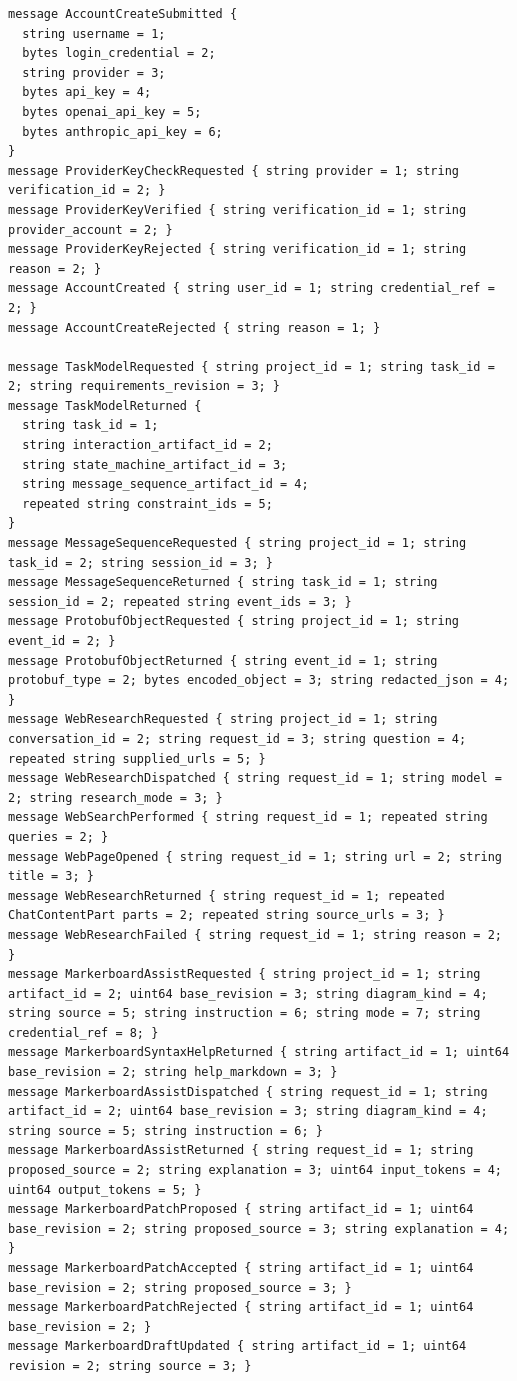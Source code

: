 \begin{lstlisting}[language={},basicstyle=\ttfamily\tiny,breaklines=true]
message AccountCreateSubmitted {
  string username = 1;
  bytes login_credential = 2;
  string provider = 3;
  bytes api_key = 4;
  bytes openai_api_key = 5;
  bytes anthropic_api_key = 6;
}
message ProviderKeyCheckRequested { string provider = 1; string verification_id = 2; }
message ProviderKeyVerified { string verification_id = 1; string provider_account = 2; }
message ProviderKeyRejected { string verification_id = 1; string reason = 2; }
message AccountCreated { string user_id = 1; string credential_ref = 2; }
message AccountCreateRejected { string reason = 1; }

message TaskModelRequested { string project_id = 1; string task_id = 2; string requirements_revision = 3; }
message TaskModelReturned {
  string task_id = 1;
  string interaction_artifact_id = 2;
  string state_machine_artifact_id = 3;
  string message_sequence_artifact_id = 4;
  repeated string constraint_ids = 5;
}
message MessageSequenceRequested { string project_id = 1; string task_id = 2; string session_id = 3; }
message MessageSequenceReturned { string task_id = 1; string session_id = 2; repeated string event_ids = 3; }
message ProtobufObjectRequested { string project_id = 1; string event_id = 2; }
message ProtobufObjectReturned { string event_id = 1; string protobuf_type = 2; bytes encoded_object = 3; string redacted_json = 4; }
message WebResearchRequested { string project_id = 1; string conversation_id = 2; string request_id = 3; string question = 4; repeated string supplied_urls = 5; }
message WebResearchDispatched { string request_id = 1; string model = 2; string research_mode = 3; }
message WebSearchPerformed { string request_id = 1; repeated string queries = 2; }
message WebPageOpened { string request_id = 1; string url = 2; string title = 3; }
message WebResearchReturned { string request_id = 1; repeated ChatContentPart parts = 2; repeated string source_urls = 3; }
message WebResearchFailed { string request_id = 1; string reason = 2; }
message MarkerboardAssistRequested { string project_id = 1; string artifact_id = 2; uint64 base_revision = 3; string diagram_kind = 4; string source = 5; string instruction = 6; string mode = 7; string credential_ref = 8; }
message MarkerboardSyntaxHelpReturned { string artifact_id = 1; uint64 base_revision = 2; string help_markdown = 3; }
message MarkerboardAssistDispatched { string request_id = 1; string artifact_id = 2; uint64 base_revision = 3; string diagram_kind = 4; string source = 5; string instruction = 6; }
message MarkerboardAssistReturned { string request_id = 1; string proposed_source = 2; string explanation = 3; uint64 input_tokens = 4; uint64 output_tokens = 5; }
message MarkerboardPatchProposed { string artifact_id = 1; uint64 base_revision = 2; string proposed_source = 3; string explanation = 4; }
message MarkerboardPatchAccepted { string artifact_id = 1; uint64 base_revision = 2; string proposed_source = 3; }
message MarkerboardPatchRejected { string artifact_id = 1; uint64 base_revision = 2; }
message MarkerboardDraftUpdated { string artifact_id = 1; uint64 revision = 2; string source = 3; }


\end{lstlisting}
